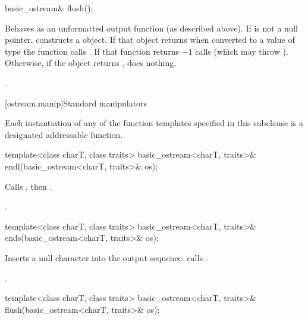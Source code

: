%
\begin{itemdecl}
basic_ostream& flush();
\end{itemdecl}

\begin{itemdescr}
\pnum
\effects
Behaves as an unformatted output function (as described above).
If
is not a null pointer,
constructs a  object. If that object returns  when converted to a value of type  the function
calls
.
If that function returns $-1$
calls
(which may throw
).
Otherwise, if the  object returns , does nothing.

\pnum
\returns
{}.
\end{itemdescr}

[ostream.manip]{Standard  manipulators}

\pnum
Each instantiation of any of the function templates
specified in this subclause
is a designated addressable function.

%
\begin{itemdecl}
template<class charT, class traits>
  basic_ostream<charT, traits>& endl(basic_ostream<charT, traits>& os);
\end{itemdecl}

\begin{itemdescr}
\pnum
\effects
Calls
,
then
.

\pnum
\returns
{}.
\end{itemdescr}

%
\begin{itemdecl}
template<class charT, class traits>
  basic_ostream<charT, traits>& ends(basic_ostream<charT, traits>& os);
\end{itemdecl}

\begin{itemdescr}
\pnum
\effects
Inserts a null character into the output sequence:
calls
.

\pnum
\returns
{}.
\end{itemdescr}

%
\begin{itemdecl}
template<class charT, class traits>
  basic_ostream<charT, traits>& flush(basic_ostream<charT, traits>& os);
\end{itemdecl}

